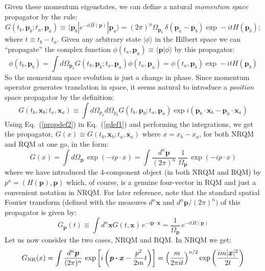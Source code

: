 \documentclass[12pt]{article}
\def\eq#1{{Eq.~(\ref{#1})}}
\def\frab#1#2{\left(\frac{#1}{#2}\right)}
\def\ket#1{|#1\rangle}                    %
\def\bk#1#2#3{{\langle #1|#2|#3\rangle}}  %
\def\amp#1#2{\langle #1 | #2\rangle}      %
\begin{document}
 Given these momentum eigenstates, we can  define a natural \textit{momentum space} propagator by the rule:
 \begin{equation}
 G(t_b,\bm{p}_b; t_a,\bm{p}_a) \equiv \bk{\bm{p}_b}{e^{-it \hat{H}(\bm{p})}}{\bm{p}_a}
 =(2\pi)^n \Omega_{\bm{p}_b}\ \delta (\bm{p}_a- \bm{p}_b)\exp-itH(\bm{p}_b);
 \label{propdef2}
\end{equation}
where $t\equiv t_b-t_a$. Given any arbitrary state $\ket{\phi}$ in the Hilbert space we can ``propagate'' the complex function $\phi(t_a,\bm{p}_a)\equiv \amp{\bm{p}}{\phi}$ by this propagator:
\begin{equation}
 \phi(t_b,\bm{p}_b)=\int d\Omega_{\bm{p}_a} G(t_b,\bm{p}_b; t_a,\bm{p}_a)\phi(t_a,\bm{p}_a)=\phi(t_a,\bm{p}_b)\exp-itH(\bm{p}_b)
 \label{momevl}
\end{equation} 
So the momentum space evolution is just a change in phase.
Since momentum operator generates translation in space, it seems natural to introduce
a \textit{position} space propagator by the definition:
 \begin{equation}
 G(t_b,\bm{x}_b; t_a,\bm{x}_a)\equiv \int d\Omega_{p_a}d\Omega_{p_b}G(t_b,\bm{p}_b; t_a,\bm{p}_a)\exp i(\bm{p}_b \cdot \bm{x}_b -\bm{p}_a \cdot \bm{x}_a)
 \label{gdef1}
\end{equation}
Using \eq{propdef2} in \eq{gdef1} and
performing the integrations, we get the  propagator, $G(x)\equiv G(t_b,\bm{x}_b; t_a,\bm{x}_a)$ where $x=x_b-x_a$, for both NRQM and RQM at one go,
 in the form:
 \begin{equation}
G(x) = \int  d\Omega_{\bm{p}} \, \exp(- i p\cdot x) = \int \frac{d^n \bm{p}}{(2\pi)^n}\ \frac{1}{\Omega_{\bm{p}}} \, \exp(-ip\cdot x)
\label{ggen}
\end{equation} 
where we have introduced the 4-component object (in both NRQM and RQM) by
$
 p^a = (H(\bm{p}), \bm{p})
$ which, of course, is a genuine four-vector in RQM and just a convenient notation in NRQM.
For later reference, note that the standard spatial Fourier transform (defined with the measures $d^n\bm{x}$ and $d^n\bm{p}/(2\pi)^n)$ of this propagator is given by:
\begin{equation}
 G_{\bm{p}} (t)\equiv  \int d^n\bm{x} G(t, \bm{x}) \, e^{-i\bm{p\cdot x}} = \frac{1}{\Omega_{\bm{p}}}\, e^{ - i tH(\bm{p})}
 \label{spaceft}
\end{equation}
Let us now consider the two cases, NRQM and RQM. 
In NRQM we get:
 \begin{equation}
 G_{\rm NR}(x) = \int \frac{d^n \bm{p}}{(2\pi)^n} \, \exp\left[i\left(\bm{p\cdot x} - \frac{p^2}{2m} t\right)\right]
 = \frab{m}{2\pi it }^{n/2} \exp\frab{im|\bm{x}|^2}{2t} 
 \label{nrqmg}
\end{equation} 
\end{document}

